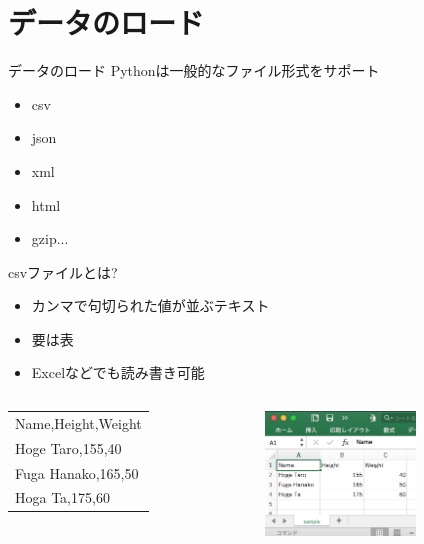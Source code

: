\documentclass[12pt, dvipdfmx]{beamer}
\begin{document}
\section{データのロード}
\begin{frame}{データのロード}
    Pythonは一般的なファイル形式をサポート
    \begin{itemize}
        \item \alert<2>{csv}
        \item \alert<2>{json}
        \item xml
        \item html
        \item gzip...
    \end{itemize}
\end{frame}
\begin{frame}{csvファイルとは?}
    \begin{itemize}
        \item カンマで句切られた値が並ぶテキスト
        \item 要は表
        \item Excelなどでも読み書き可能
    \end{itemize}
    \begin{columns}
        \begin{column}{0.5\textwidth}
            \begin{table}[h]
                \begin{tabular}{|l|}
                    \hline
                    Name,Height,Weight\\
                    Hoge Taro,155,40\\
                    Fuga Hanako,165,50\\
                    Hoga Ta,175,60\\\hline
                \end{tabular}
            \end{table}
        \end{column}
        \begin{column}{0.5\textwidth}
            \begin{figure}[h]
                \centering
                \includegraphics[width=4cm]{img/excel_csv.png}
            \end{figure}
        \end{column}
    \end{columns}
\end{frame}
\end{document}
